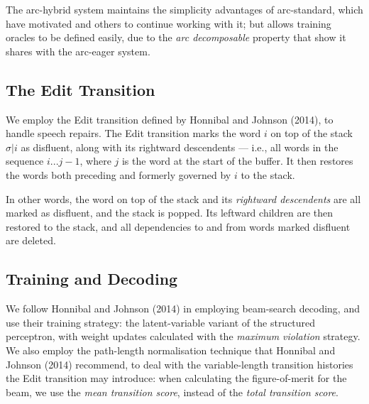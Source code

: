 \documentclass[11pt,letterpaper]{article}
\begin{document}
The arc-hybrid system maintains the simplicity advantages of arc-standard, which
have motivated \citet{huang:10} and others to continue working with it; but allows
training oracles to be defined easily, due to the \emph{arc decomposable}
property that \citet{goldberg:13} show it shares with the arc-eager system.

\subsection{The Edit Transition}

We employ the Edit transition defined by Honnibal and Johnson (2014), to handle
speech repairs.
The Edit transition marks the word $i$ on top of the stack $\sigma | i$ as
disfluent, along with its rightward descendents --- i.e., all words in the
sequence $i...j-1$, where $j$ is the word at the start of the buffer. It then
restores the words both preceding and formerly governed by $i$ to the stack.

In other words, the word on top of the stack and its \emph{rightward descendents}
are all marked as disfluent, and the stack is popped. Its leftward children are
then restored to the stack, and all dependencies to and from words marked
disfluent are deleted.



\subsection{Training and Decoding}

We follow Honnibal and Johnson (2014) in employing beam-search decoding, and
use their training strategy: the \citet{sun:09} latent-variable
variant of the \citet{collins:02} structured perceptron, with weight updates
calculated with the \citet{huang:12} \emph{maximum violation} strategy.  We
also employ the path-length normalisation technique that Honnibal and Johnson (2014)
recommend, to deal with the variable-length transition histories the Edit transition
may introduce: 
when calculating the figure-of-merit for the beam, we use the
\emph{mean transition score}, instead of the \emph{total transition score}.
\end{document}
